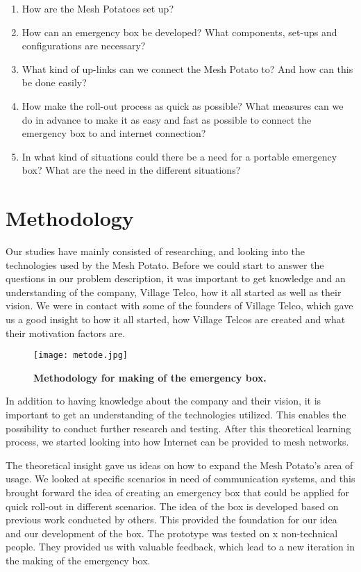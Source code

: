 \begin{enumerate}
\item How are the Mesh Potatoes set up? 
\item How can an emergency box be developed? What components, set-ups and configurations are necessary?
\item What kind of up-links can we connect the Mesh Potato to? And how can this be done easily? 
\item How make the roll-out process as quick as possible? What measures can we do in advance to make it as easy and fast as possible to connect the emergency box to and internet connection?
\item In what kind of situations could there be a need for a portable emergency box? What are the need in the different situations?
\end{enumerate}


\section{Methodology}

Our studies have mainly consisted of researching, and looking into the technologies used by the Mesh Potato. Before we could start to answer the questions in our problem description, it was important to get knowledge and an understanding of the company, Village Telco, how it all started as well as their vision. We were in contact with some of the founders of Village Telco, which gave us a good insight to how it all started, how Village Telcos are created and what their motivation factors are. 

\begin{figure}[b]
  \centering
      \texttt{[image: metode.jpg]}
  \caption [Methodology for making of the emergency box]{\textbf{Methodology for making of the emergency box.}}
  \label{fig:metode}
\end{figure}


In addition to having knowledge about the company and their vision, it is important to get an understanding of the technologies utilized. This enables the possibility to conduct further research and testing. After this theoretical learning process, we started looking into how Internet can be provided to mesh networks. 

The theoretical insight gave us ideas on how to expand the Mesh Potato's area of usage. We looked at specific scenarios in need of communication systems, and this brought forward the idea of creating an emergency box that could be applied for quick roll-out in different scenarios. The idea of the box is developed based on previous work conducted by others. This provided the foundation for our idea and our development of the box. The prototype was tested on x non-technical people. They provided us with valuable feedback, which lead to a new iteration in the making of the emergency box. 

